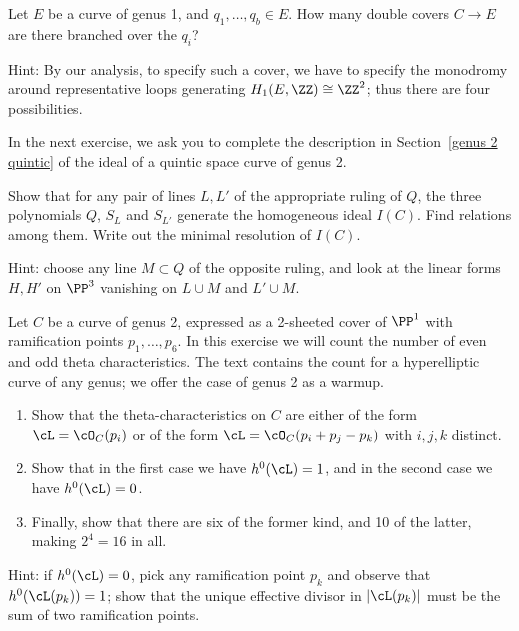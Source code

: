 \begin{exercise} Let $E$ be a curve of genus 1, and $q_1,\dots,q_b \in E$. How many double covers $C \to E$ are there branched over the $q_i$?

Hint: By our analysis, to specify such a cover, we have to specify the monodromy around representative loops generating $H_1(E, \ZZ) \cong \ZZ^2$; thus there are four possibilities.
\end{exercise}



In the next exercise, we ask you to complete the description in Section~\ref{genus 2 quintic} of the ideal of a quintic space curve of genus 2.

\begin{exercise}\label{ideal of genus 2 degree 5} 
Show that for any pair of lines $L, L'$ of the appropriate ruling of $Q$, the three polynomials $Q$, $S_L$ and $S_{L'}$ generate the homogeneous ideal $I(C)$. Find relations among them. Write out the minimal resolution of $I(C)$.

Hint: choose any line $M \subset Q$ of the opposite ruling, and look at the linear forms $H, H'$ on $\PP^3$ vanishing on $L \cup M$ and $L' \cup M$.
\end{exercise}


\begin{exercise}\label{theta char on genus 2} %
 Let $C$ be a curve of genus 2, expressed as a 2-sheeted cover of $\PP^1$ with ramification points $p_1,\dots,p_6$. In this exercise we will
 count the number of
 even and odd theta characteristics.
The text contains the count for a hyperelliptic curve of any genus; we offer 
the case of genus 2 as a warmup.
 \begin{enumerate}
 \item Show that the theta-characteristics on $C$ are either of the form $\cL = \cO_C(p_i)$ or of the form $\cL = \cO_C(p_i + p_j - p_k)$ with $i, j, k$ distinct. 
 \item Show that in the first case we have $h^0(\cL) = 1$, and in the second case we have $h^0(\cL) = 0$. 
 \item Finally, show that there are six of the former kind, and 10 of the latter, making $2^4 = 16$ in all.
 \end{enumerate} 
 
 Hint: if $h^0(\cL) = 0$, pick any ramification point $p_k$ and observe that $h^0(\cL(p_k)) = 1$; show that  the unique effective divisor in $|\cL(p_k)|$ must be the sum of two ramification points. 
 \end{exercise}
 
